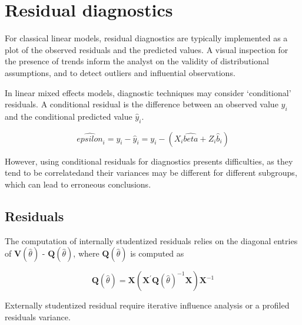 \documentclass[Main.tex]{subfiles}
\begin{document}
\section{Residual diagnostics} %
For classical linear models, residual diagnostics are typically implemented as a plot of the observed residuals and the predicted values. A visual inspection for the presence of trends inform the analyst on the validity of distributional assumptions, and to detect outliers and influential observations.

In linear mixed effects models, diagnostic techniques may consider `conditional' residuals. A conditional residual is the difference between an observed value $y_{i}$ and the conditional predicted value $\hat{y}_{i} $.

\[ \hat{epsilon}_{i} = y_{i} - \hat{y}_{i} = y_{i} - ( X_{i}\hat{beta} + Z_{i}\hat{b}_{i}) \]

However, using conditional residuals for diagnostics presents difficulties, as they tend to be correlatedand their variances may be different for different subgroups, which can lead to erroneous conclusions.



\subsection{Residuals}

The computation of internally studentized residuals relies on the diagonal entries of
$\boldsymbol{V} (\hat{\theta})$ - $\boldsymbol{Q} (\hat{\theta})$, where $\boldsymbol{Q} (\hat{\theta})$ is computed as

\[ \boldsymbol{Q} (\hat{\theta}) = \boldsymbol{X} ( \boldsymbol{X}^{\prime}\boldsymbol{Q} (\hat{\theta})^{-1}\boldsymbol{X})\boldsymbol{X}^{-1} \]

Externally  studentized residual require iterative influence analysis or a profiled residuals variance.
\end{document}
